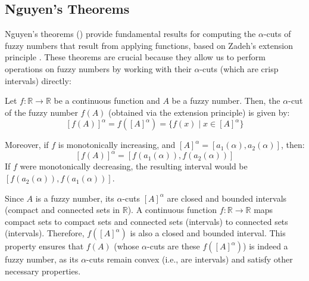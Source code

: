 







\subsection{Nguyen's Theorems}
Nguyen's theorems (\cite[Thm. 1.3.1, 1.3.2]{FULLER2}) provide fundamental results for computing the $\alpha$-cuts of fuzzy numbers that result from applying functions, based on Zadeh's extension principle \cite{NGUYEN1978}. These theorems are crucial because they allow us to perform operations on fuzzy numbers by working with their $\alpha$-cuts (which are crisp intervals) directly:

\begin{theorem}
    Let $f: \mathbb{R} \to \mathbb{R}$ be a continuous function and $A$ be a fuzzy number. Then, the $\alpha$-cut of the fuzzy number $f(A)$ (obtained via the extension principle) is given by:
    \[
    [f(A)]^{\alpha} = f([A]^{\alpha}) = \{f(x) \mid x \in [A]^\alpha\}
    \]

    Moreover, if $f$ is monotonically increasing, and $[A]^\alpha = [a_1(\alpha), a_2(\alpha)]$, then:
    \[
    [f(A)]^{\alpha} = [f(a_1(\alpha)), f(a_2(\alpha))]
    \]
    If $f$ were monotonically decreasing, the resulting interval would be $[f(a_2(\alpha)), f(a_1(\alpha))]$.
\end{theorem}

\begin{remark}
Since $A$ is a fuzzy number, its $\alpha$-cuts $[A]^\alpha$ are closed and bounded intervals (compact and connected sets in $\mathbb{R}$). A continuous function $f: \mathbb{R} \to \mathbb{R}$ maps compact sets to compact sets and connected sets (intervals) to connected sets (intervals). Therefore, $f([A]^\alpha)$ is also a closed and bounded interval. This property ensures that $f(A)$ (whose $\alpha$-cuts are these $f([A]^\alpha)$) is indeed a fuzzy number, as its $\alpha$-cuts remain convex (i.e., are intervals) and satisfy other necessary properties.
\end{remark}

